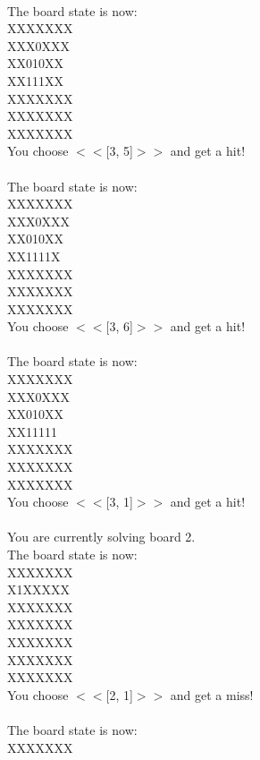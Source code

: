 \documentclass[pdflatex,sn-nature]{sn-jnl}%
\theoremstyle{thmstyleone}%
\theoremstyle{thmstyletwo}%
\theoremstyle{thmstylethree}%
\begin{document}
 $~$\\ 
The board state is now: $~$\\ 
XXXXXXX $~$\\ 
XXX0XXX $~$\\ 
XX010XX $~$\\ 
XX111XX $~$\\ 
XXXXXXX $~$\\ 
XXXXXXX $~$\\ 
XXXXXXX $~$\\ 
You choose $<<$[3, 5]$>>$ and get a hit! $~$\\ 
 $~$\\ 
The board state is now: $~$\\ 
XXXXXXX $~$\\ 
XXX0XXX $~$\\ 
XX010XX $~$\\ 
XX1111X $~$\\ 
XXXXXXX $~$\\ 
XXXXXXX $~$\\ 
XXXXXXX $~$\\ 
You choose $<<$[3, 6]$>>$ and get a hit! $~$\\ 
 $~$\\ 
The board state is now: $~$\\ 
XXXXXXX $~$\\ 
XXX0XXX $~$\\ 
XX010XX $~$\\ 
XX11111 $~$\\ 
XXXXXXX $~$\\ 
XXXXXXX $~$\\ 
XXXXXXX $~$\\ 
You choose $<<$[3, 1]$>>$ and get a hit! $~$\\ 
 $~$\\ 
You are currently solving board 2. $~$\\ 
The board state is now: $~$\\ 
XXXXXXX $~$\\ 
X1XXXXX $~$\\ 
XXXXXXX $~$\\ 
XXXXXXX $~$\\ 
XXXXXXX $~$\\ 
XXXXXXX $~$\\ 
XXXXXXX $~$\\ 
You choose $<<$[2, 1]$>>$ and get a miss! $~$\\ 
 $~$\\ 
The board state is now: $~$\\ 
XXXXXXX $~$\\ 
\end{document}
